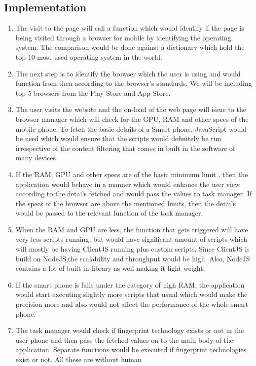 \documentclass[journal]{IEEEtran}
\begin{document}
\subsection{Implementation}
\begin{enumerate}
  \item The visit to the page will call a function which would identify if the page is being visited through a browser for mobile by identifying the operating system. The comparison would be done against a dictionary which hold the top 10 most used operating system in the world.
  \item The next step is to identify the browser which the user is using and would function from then according to the browser's standards. We will be including top 5 browsers from the Play Store and App Store. 
  \item The user visits the website and the on-load of the web page will issue to the
  browser manager which will check for the GPU, RAM and other specs of the mobile phone.
  To fetch the basic details of a Smart phone, JavaScript would be used which would
  ensure that the scripts would definitely be run irrespective of the content filtering
  that comes in built in the software of many devices.
  \item If the RAM, GPU and other specs are of the basic minimum limit , then the
  application would behave in a manner which would enhance the user view according to the  details fetched and would pass the values to task manager. If the specs of the browser
  are above the mentioned limits, then the details would be passed to the relevant
  function of the task manager. 
  \item When the RAM and GPU are less, the function that gets triggered will have very less scripts running, but would have significant amount of scripts which will mostly be having ClientJS running plus custom scripts. Since ClientJS is build on NodeJS,the scalability and throughput would be high. Also, NodeJS contains a lot of built in library as well making it light weight. 
  \item If the smart phone is falls under the category of high RAM, the application would start executing slightly more scripts that usual which would make the precision more and also would not affect the performance of the whole smart phone. 
  \item The task manager would check if fingerprint technology exists or not in the user phone and then pass the fetched values on to the main body of the application. Separate
  functions would be executed if fingerprint technologies exist or not. All these are without human

\end{enumerate}
\end{document}
